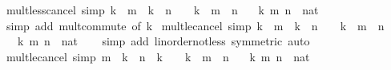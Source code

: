 \begin{isabellebody}
\ mult{\isacharunderscore}{\kern0pt}less{\isacharunderscore}{\kern0pt}cancel{}\ {\isacharbrackleft}{\kern0pt}simp{\isacharbrackright}{\kern0pt}{\isacharcolon}{\kern0pt}\ {\isachardoublequoteopen}k\ {\isacharasterisk}{\kern0pt}\ m\ {\isacharless}{\kern0pt}\ k\ {\isacharasterisk}{\kern0pt}\ n\ {\isasymlongleftrightarrow}\ {}\ {\isacharless}{\kern0pt}\ k\ {\isasymand}\ m\ {\isacharless}{\kern0pt}\ n{\isachardoublequoteclose}\isanewline
\ \ \ k\ m\ n\ {\isacharcolon}{\kern0pt}{\isacharcolon}{\kern0pt}\ nat\isanewline
%
\isadelimproof
\ \ %
\endisadelimproof
%
\isatagproof
{}\isamarkupfalse%
\ {\isacharparenleft}{\kern0pt}simp\ add{\isacharcolon}{\kern0pt}\ mult{\isachardot}{\kern0pt}commute\ {\isacharbrackleft}{\kern0pt}of\ k{\isacharbrackright}{\kern0pt}{\isacharparenright}{\kern0pt}%
\endisatagproof
{\isafoldproof}%
%
\isadelimproof
\isanewline
%
\endisadelimproof
\isanewline
{}\isamarkupfalse%
\ mult{\isacharunderscore}{\kern0pt}le{\isacharunderscore}{\kern0pt}cancel{}\ {\isacharbrackleft}{\kern0pt}simp{\isacharbrackright}{\kern0pt}{\isacharcolon}{\kern0pt}\ {\isachardoublequoteopen}k\ {\isacharasterisk}{\kern0pt}\ m\ {\isasymle}\ k\ {\isacharasterisk}{\kern0pt}\ n\ {\isasymlongleftrightarrow}\ {\isacharparenleft}{\kern0pt}{}\ {\isacharless}{\kern0pt}\ k\ {\isasymlongrightarrow}\ m\ {\isasymle}\ n{\isacharparenright}{\kern0pt}{\isachardoublequoteclose}\isanewline
\ \ \ k\ m\ n\ {\isacharcolon}{\kern0pt}{\isacharcolon}{\kern0pt}\ nat\isanewline
%
\isadelimproof
\ \ %
\endisadelimproof
%
\isatagproof
{}\isamarkupfalse%
\ {\isacharparenleft}{\kern0pt}simp\ add{\isacharcolon}{\kern0pt}\ linorder{\isacharunderscore}{\kern0pt}not{\isacharunderscore}{\kern0pt}less\ {\isacharbrackleft}{\kern0pt}symmetric{\isacharbrackright}{\kern0pt}{\isacharcomma}{\kern0pt}\ auto{\isacharparenright}{\kern0pt}%
\endisatagproof
{\isafoldproof}%
%
\isadelimproof
\isanewline
%
\endisadelimproof
\isanewline
{}\isamarkupfalse%
\ mult{\isacharunderscore}{\kern0pt}le{\isacharunderscore}{\kern0pt}cancel{}\ {\isacharbrackleft}{\kern0pt}simp{\isacharbrackright}{\kern0pt}{\isacharcolon}{\kern0pt}\ {\isachardoublequoteopen}m\ {\isacharasterisk}{\kern0pt}\ k\ {\isasymle}\ n\ {\isacharasterisk}{\kern0pt}\ k\ {\isasymlongleftrightarrow}\ {\isacharparenleft}{\kern0pt}{}\ {\isacharless}{\kern0pt}\ k\ {\isasymlongrightarrow}\ m\ {\isasymle}\ n{\isacharparenright}{\kern0pt}{\isachardoublequoteclose}\isanewline
\ \ \ k\ m\ n\ {\isacharcolon}{\kern0pt}{\isacharcolon}{\kern0pt}\ nat\isanewline

\end{isabellebody}
